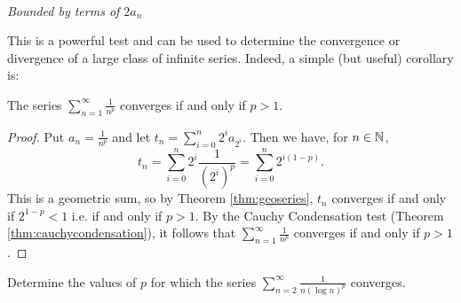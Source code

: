 \documentclass[../analysis1.tex]{subfiles}
\begin{document}
\begin{center}
\begin{minipage}{0.31\textwidth}
{%
      }\\[1ex]
      \footnotesize \textit{Bounded by terms of $2a_n$}
    \end{minipage}
\end{center}





This is a powerful test and can be used to determine the convergence or divergence of a large class of infinite series. Indeed, a simple (but useful) corollary is:


\begin{corollary}
\label{cor:pseries}
    \begin{shaded*}
        The series $\sum_{n=1}^{\infty}\frac{1}{n^p}$ converges if and only if $p>1$.
    \end{shaded*}
\end{corollary}
\begin{proof}
    Put $a_n=\frac{1}{n^p}$ and let $t_n=\sum_{i=0}^n2^ia_{2^i}$. Then we have, for $n\in\mathbb{N}$, $$t_n=\sum_{i=0}^n2^i\frac{1}{\left(2^i\right)^p}=\sum_{i=0}^n2^{i(1-p)}.$$
    This is a geometric sum, so by Theorem \ref{thm:geoseries}, $t_n$ converges if and only if $2^{1-p}<1$ i.e. if and only if $p>1$. By the Cauchy Condensation test (Theorem \ref{thm:cauchycondensation}), it follows that $\sum_{n=1}^\infty \frac{1}{n^p}$ converges if and only if $p>1$.\qedhere 
\end{proof}

\begin{exercise*}
    Determine the values of $p$ for which the series $\sum_{n=2}^{\infty}\frac{1}{n(\log n)^p}$ converges.
\end{exercise*}
    
\end{document}

